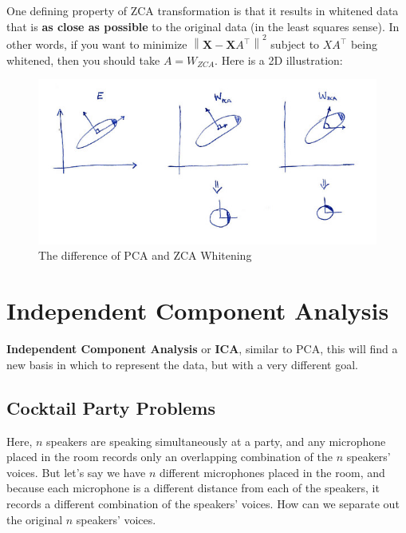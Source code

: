 \documentclass[a3paper, 12pt]{book} %
\begin{document}
One defining property of ZCA transformation is that it results in whitened data that is \textbf{as close as possible} to the original data (in the least squares sense). In other words, if you want to minimize $\left\lVert \mathbf{X}-\mathbf{X}A^\top \right\rVert^2$ subject to $XA^\top$ being whitened, then you should take $A=W_{ZCA}$. Here is a 2D illustration:

\begin{figure}[htpb]
	\centering
	\includegraphics[width=\linewidth]{figures/zca.jpg}
	\caption{The difference of PCA and ZCA Whitening}
	\label{fig:boat1}
\end{figure}


\chapter{Independent Component Analysis}
\textbf{Independent Component Analysis} or \textbf{ICA}, similar to PCA, this will find a new basis in which to represent the data, but with a very different goal.

\section{Cocktail Party Problems}
Here, $n$ speakers are speaking simultaneously at a party, and any microphone placed in the room records only an overlapping combination of the $n$ speakers' voices. But let's say we have $n$ different microphones placed in the room, and because each microphone is a different distance from each of the speakers, it records a different combination of the speakers' voices. How can we separate out the original $n$ speakers' voices.
\end{document}
